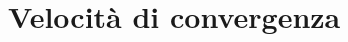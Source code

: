 \documentclass[\main/main.tex]{subfiles}
\begin{document}
\chapter{Velocità di convergenza}
\end{document}
